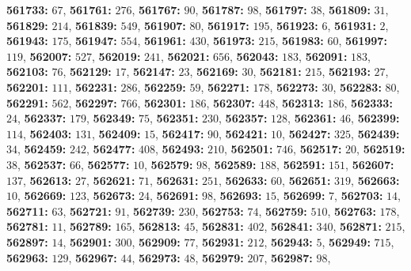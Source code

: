 \textsf{\bfseries 561733:} $67$, \textsf{\bfseries 561761:} $276$, \textsf{\bfseries 561767:} $90$, \textsf{\bfseries 561787:} $98$, \textsf{\bfseries 561797:} $38$, \textsf{\bfseries 561809:} $31$, \textsf{\bfseries 561829:} $214$, \textsf{\bfseries 561839:} $549$, \textsf{\bfseries 561907:} $80$, \textsf{\bfseries 561917:} $195$, \textsf{\bfseries 561923:} $6$, \textsf{\bfseries 561931:} $2$, \textsf{\bfseries 561943:} $175$, \textsf{\bfseries 561947:} $554$, \textsf{\bfseries 561961:} $430$, \textsf{\bfseries 561973:} $215$, \textsf{\bfseries 561983:} $60$, \textsf{\bfseries 561997:} $119$, \textsf{\bfseries 562007:} $527$, \textsf{\bfseries 562019:} $241$, \textsf{\bfseries 562021:} $656$, \textsf{\bfseries 562043:} $183$, \textsf{\bfseries 562091:} $183$, \textsf{\bfseries 562103:} $76$, \textsf{\bfseries 562129:} $17$, \textsf{\bfseries 562147:} $23$, \textsf{\bfseries 562169:} $30$, \textsf{\bfseries 562181:} $215$, \textsf{\bfseries 562193:} $27$, \textsf{\bfseries 562201:} $111$, \textsf{\bfseries 562231:} $286$, \textsf{\bfseries 562259:} $59$, \textsf{\bfseries 562271:} $178$, \textsf{\bfseries 562273:} $30$, \textsf{\bfseries 562283:} $80$, \textsf{\bfseries 562291:} $562$, \textsf{\bfseries 562297:} $766$, \textsf{\bfseries 562301:} $186$, \textsf{\bfseries 562307:} $448$, \textsf{\bfseries 562313:} $186$, \textsf{\bfseries 562333:} $24$, \textsf{\bfseries 562337:} $179$, \textsf{\bfseries 562349:} $75$, \textsf{\bfseries 562351:} $230$, \textsf{\bfseries 562357:} $128$, \textsf{\bfseries 562361:} $46$, \textsf{\bfseries 562399:} $114$, \textsf{\bfseries 562403:} $131$, \textsf{\bfseries 562409:} $15$, \textsf{\bfseries 562417:} $90$, \textsf{\bfseries 562421:} $10$, \textsf{\bfseries 562427:} $325$, \textsf{\bfseries 562439:} $34$, \textsf{\bfseries 562459:} $242$, \textsf{\bfseries 562477:} $408$, \textsf{\bfseries 562493:} $210$, \textsf{\bfseries 562501:} $746$, \textsf{\bfseries 562517:} $20$, \textsf{\bfseries 562519:} $38$, \textsf{\bfseries 562537:} $66$, \textsf{\bfseries 562577:} $10$, \textsf{\bfseries 562579:} $98$, \textsf{\bfseries 562589:} $188$, \textsf{\bfseries 562591:} $151$, \textsf{\bfseries 562607:} $137$, \textsf{\bfseries 562613:} $27$, \textsf{\bfseries 562621:} $71$, \textsf{\bfseries 562631:} $251$, \textsf{\bfseries 562633:} $60$, \textsf{\bfseries 562651:} $319$, \textsf{\bfseries 562663:} $10$, \textsf{\bfseries 562669:} $123$, \textsf{\bfseries 562673:} $24$, \textsf{\bfseries 562691:} $98$, \textsf{\bfseries 562693:} $15$, \textsf{\bfseries 562699:} $7$, \textsf{\bfseries 562703:} $14$, \textsf{\bfseries 562711:} $63$, \textsf{\bfseries 562721:} $91$, \textsf{\bfseries 562739:} $230$, \textsf{\bfseries 562753:} $74$, \textsf{\bfseries 562759:} $510$, \textsf{\bfseries 562763:} $178$, \textsf{\bfseries 562781:} $11$, \textsf{\bfseries 562789:} $165$, \textsf{\bfseries 562813:} $45$, \textsf{\bfseries 562831:} $402$, \textsf{\bfseries 562841:} $340$, \textsf{\bfseries 562871:} $215$, \textsf{\bfseries 562897:} $14$, \textsf{\bfseries 562901:} $300$, \textsf{\bfseries 562909:} $77$, \textsf{\bfseries 562931:} $212$, \textsf{\bfseries 562943:} $5$, \textsf{\bfseries 562949:} $715$, \textsf{\bfseries 562963:} $129$, \textsf{\bfseries 562967:} $44$, \textsf{\bfseries 562973:} $48$, \textsf{\bfseries 562979:} $207$, \textsf{\bfseries 562987:} $98$, 

